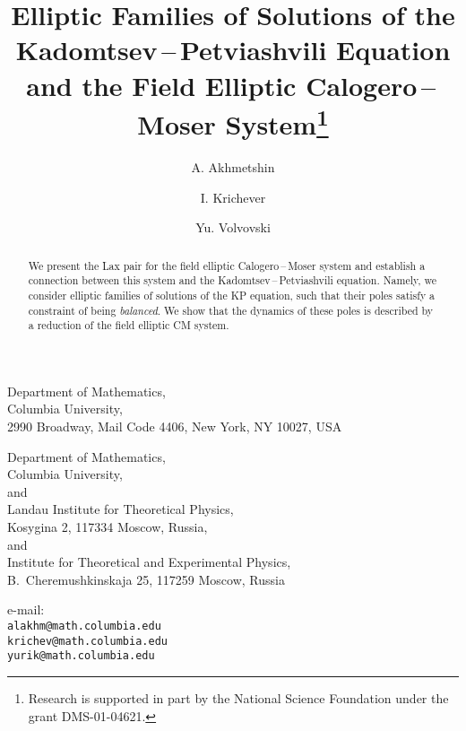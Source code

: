 \documentclass[a4paper,11pt]{article}
\theoremstyle{plain}
\theoremstyle{remark}
\begin{document}
\begin{titlepage}

\title{Elliptic Families of Solutions of the
Kadomtsev\,--\,Petviashvili Equation and
the Field Elliptic Calogero\,--\,Moser
System\thanks{Research
is supported in part by the National Science
Foundation under the grant DMS-01-04621.}}

\bigskip
\author{A. Akhmetshin\myHighlight{${}^{**}$}\coordHE{}\and I. Krichever\myHighlight{${}^{\dagger}$}\coordHE{}\and
Yu. Volvovski\myHighlight{${}^{\ddagger}$}\coordHE{}}
\date{}
\maketitle

\thispagestyle{empty}

\begin{center}
\small
\myHighlight{${}^{**\,\ddagger}$}\coordHE{}Department of Mathematics,\\
Columbia University,\\
2990 Broadway, Mail Code 4406, New York, NY 10027, USA
\end{center}

\begin{center}
\small
\myHighlight{${}^{\dagger}$}\coordHE{}Department of Mathematics,\\
Columbia University,\\
and\\
Landau Institute for Theoretical Physics,\\
Kosygina 2, 117334 Moscow, Russia,\\
and\\
Institute for Theoretical and Experimental Physics,\\
B.~Cheremushkinskaja 25, 117259 Moscow, Russia
\end{center}

\begin{center}
\small
e-mail:\\
\myHighlight{${}^{**}$}\coordHE{}\verb"alakhm@math.columbia.edu"\\
\myHighlight{${}^{\dagger}$}\coordHE{}\verb"krichev@math.columbia.edu"\\
\myHighlight{${}^{\ddagger}$}\coordHE{}\verb"yurik@math.columbia.edu"
\end{center}

\bigskip
\begin{abstract}
We present the Lax pair for the field elliptic Calogero\,--\,Moser
system and establish a connection between this system and the
Kadomtsev\,--\,Petviashvili equation.
Namely, we consider elliptic families of solutions of the KP equation,
such that their poles satisfy a constraint of being \emph{balanced}.
We show that the dynamics of these poles is described by a reduction
of the field elliptic CM system.


\end{abstract}
\end{titlepage}
\end{document}
